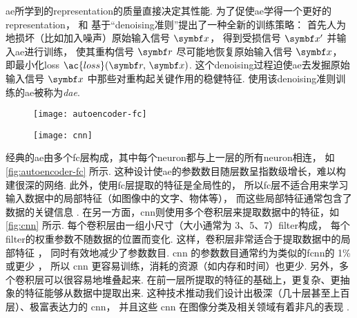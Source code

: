\ac{ae}所学到的\ac{representation}的质量直接决定其性能.
为了促使\ac{ae}学得一个更好的\ac{representation}，
 和 
基于\enquote{\ac{denoising}准则}提出了一种全新的训练策略：
首先人为地损坏（比如加入噪声）原始输入信号 $\B{x}$，
得到受损信号 $\B{x}'$ 并输入\ac{ae}进行训练，
使其重构信号 $\B{r}$ 尽可能地恢复原始输入信号 $\B{x}$，
即最小化\acl{loss} $\ac{loss}(\B{r}, \,\B{x})$.
这个\ac{denoising}过程迫使\ac{ae}去发掘原始输入信号 $\B{x}$
中那些对重构起关键作用的稳健特征.
使用该\ac{denoising}准则训练的\ac{ae}被称为\emph{\ac{dae}}.

\begin{figure}[htp]
  \centering
  \texttt{[image: autoencoder-fc]}
  \label{fig:autoencoder-fc}
\end{figure}

\begin{figure}[htp]
  \centering
  \texttt{[image: cnn]}
  \label{fig:cnn}
\end{figure}

经典的\ac{ae}由多个\ac{fc}层构成，其中每个\ac{neuron}都与上一层的所有\ac{neuron}相连，
如\autoref{fig:autoencoder-fc} 所示.
这种设计使\ac{ae}的参数数目随层数呈指数级增长，难以构建很深的网络.
此外，使用\ac{fc}层提取的特征是全局性的，
所以\ac{fc}层不适合用来学习输入数据中的局部特征（如图像中的文字、物体等），
而这些局部特征通常包含了数据的关键信息 \cite{masci2011}.
在另一方面，\ac{cnn}则使用多个卷积层来提取数据中的特征，如\autoref{fig:cnn} 所示.
每个卷积层由一组小尺寸（大小通常为 3、5、7）\ac{filter}构成，
每个\ac{filter}的权重参数不随数据的位置而变化.
这样，卷积层非常适合于提取数据中的局部特征 \cite{leCun1998}，
同时有效地减少了参数数目.
\ac{cnn} 的参数数目通常约为类似的\ac{fc}\ac{nn}的 1\% 或更少 \cite{grais2017}，
所以 \ac{cnn} 更容易训练，消耗的资源（如内存和时间）也更少.
另外，多个卷积层可以很容易地堆叠起来.
在前一层所提取的特征的基础上，更复杂、更抽象的特征能够从数据中提取出来.
这种技术推动我们设计出极深（几十层甚至上百层）、极富表达力的 \ac{cnn}，
并且这些 \ac{cnn} 在图像分类及相关领域有着非凡的表现
\cite{krizhevsky2012,simonyan2014,szegedy2015,ma2019}.

